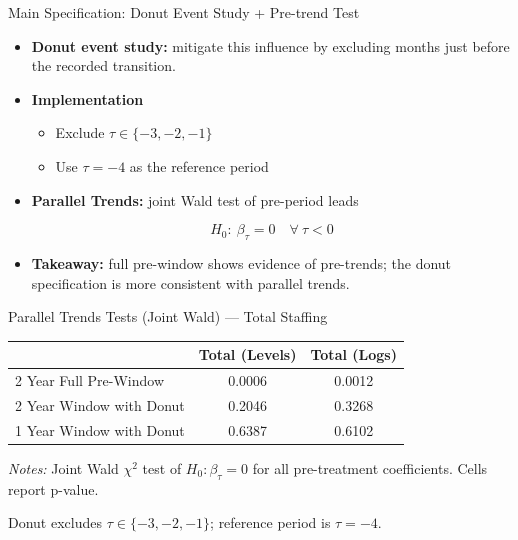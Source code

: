 \documentclass{beamer}
\begin{document}
\begin{frame}[t]{Main Specification: Donut Event Study + Pre-trend Test}

\small
\begin{itemize}
	\item \textbf{Donut event study:} mitigate this influence by excluding months just before the recorded transition.
	\vspace{0.35em}
	\item \textbf{Implementation}
	
	\begin{itemize}
		\item Exclude $\tau \in \{-3,-2,-1\}$
		\item Use $\tau=-4$ as the reference period
	\end{itemize}
	
	\pause
	\vspace{0.35em}
	\item \textbf{Parallel Trends:} joint Wald test of pre-period leads

	\[
	H_0:\ \beta_{\tau}=0 \quad \forall\ \tau<0
	\]
	
	\vspace{0.2em}
	\item \textbf{Takeaway:} full pre-window shows evidence of pre-trends; the donut specification is more consistent 		with parallel trends.
	
\end{itemize}
\end{frame}

\begin{frame}{Parallel Trends Tests (Joint Wald) --- Total Staffing}

\small
\centering
\renewcommand{\arraystretch}{1.15}
\setlength{\tabcolsep}{8pt}

\begin{threeparttable}
\caption{\textbf{Pre-trend Wald Test p-values (Total Staffing)}}
\begin{tabular}{@{} l cc @{}}
\toprule
 & \textbf{Total (Levels)} & \textbf{Total (Logs)} \\
\midrule
2 Year Full Pre-Window     & 0.0006 & 0.0012 \\
2 Year Window with Donut   & 0.2046 & 0.3268 \\
1 Year Window with Donut   & 0.6387 & 0.6102 \\
\bottomrule
\end{tabular}

\begin{tablenotes}[flushleft]
\footnotesize
\item \textit{Notes:} Joint Wald $\chi^2$ test of $H_0:\beta_\tau=0$ for all pre-treatment coefficients. Cells report p-value.
\item Donut excludes $\tau\in\{-3,-2,-1\}$; reference period is $\tau=-4$.
\end{tablenotes}
\end{threeparttable}
\end{frame}
\end{document}
